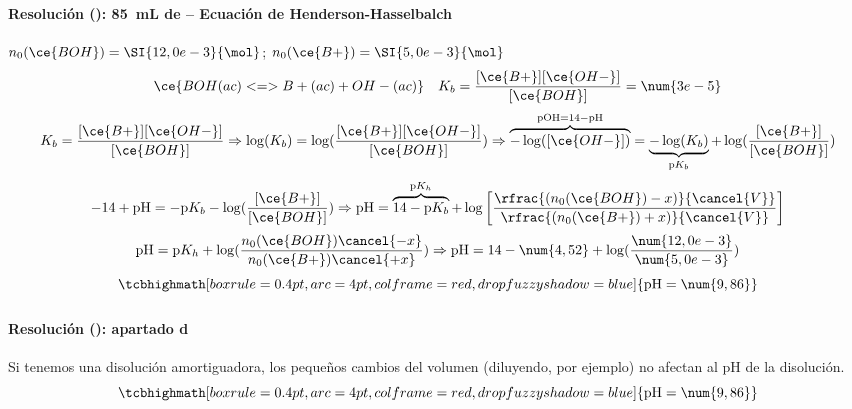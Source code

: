 \begin{frame}
	\frametitle{\ejerciciocmd}
	\framesubtitle{Resolución (): \SI{85}{\milli\liter} de  -- Ecuación de Henderson-Hasselbalch}
	\quad$n_0(\ce{BOH})=\SI{12,0e-3}{\mol}$; $n_0(\ce{B+})=\SI{5,0e-3}{\mol}$
	$$
		\ce{BOH(ac) <=> B+(ac) + OH-(ac)}\quad K_b=\frac{[\ce{B+}][\ce{OH-}]}{[\ce{BOH}]}=\num{3e-5}
	$$
	$$
		K_b=\frac{[\ce{B+}][\ce{OH-}]}{[\ce{BOH}]}\Rightarrow\log(K_b)=\log(\frac{[\ce{B+}][\ce{OH-}]}{[\ce{BOH}]})\Rightarrow\overbrace{-\log([\ce{OH-}])}^{\text{pOH}=14-\text{pH}}=\underbrace{-\log(K_b)}_{\text{p}K_b}+\log(\frac{[\ce{B+}]}{[\ce{BOH}]})
	$$
	$$
		-14+\text{pH}=-\text{p}K_b-\log(\frac{[\ce{B+}]}{[\ce{BOH}]})\Rightarrow\text{pH}=\overbrace{14-\text{p}K_b}^{\text{p}K_h}+\log\left[\frac{\rfrac{(n_0(\ce{BOH})-x)}{\cancel{V}}}{\rfrac{(n_0(\ce{B+})+x)}{\cancel{V}}}\right]
	$$
	$$
		\text{pH}=\text{p}K_h+\log(\frac{n_0(\ce{BOH})\cancel{-x}}{n_0(\ce{B+})\cancel{+x}})\Rightarrow
		\text{pH}=14-\num{4,52}+\log(\frac{\num{12,0e-3}}{\num{5,0e-3}})
	$$
		$$
			\tcbhighmath[boxrule=0.4pt,arc=4pt,colframe=red,drop fuzzy shadow=blue]{\text{pH}=\num{9,86}}
		$$
\end{frame}
%
\begin{frame}
	\frametitle{\ejerciciocmd}
	\framesubtitle{Resolución (): apartado d}
	Si tenemos una disolución amortiguadora, los pequeños cambios del volumen (diluyendo, por ejemplo) no afectan al pH de la disolución.
	$$
		\tcbhighmath[boxrule=0.4pt,arc=4pt,colframe=red,drop fuzzy shadow=blue]{\text{pH}=\num{9,86}}
	$$
\end{frame}
